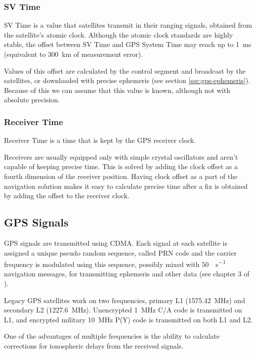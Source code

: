 \subsubsection{SV Time}
SV Time is a value that satellites transmit in their ranging signals,
obtained from the satellite's atomic clock.
Although the atomic clock standards are highly stable, the offset between SV
Time and GPS System Time may reach up to \SI{1}{\milli\second} (equivalent to
\SI{300}{\kilo\meter} of measurement error).

Values of this offset are calculated by the control segment
and broadcast by the satellites, or downloaded with precise ephemeris
(see section \ref{sec:gps-ephemeris}).
Because of this we can assume that this value is known, although not
with absolute precision.

\subsubsection{Receiver Time}
Receiver Time is a time that is kept by the GPS receiver clock.

Receivers are usually equipped only with simple crystal oscillators
and aren't capable of keeping precise time.
This is solved by adding the clock offset as a fourth dimension of the receiver position.
Having clock offset as a part of the navigation solution makes it easy to calculate
precise time after a fix is obtained by adding the offset to the receiver clock.

\subsection{GPS Signals}
GPS signals are transmitted using CDMA.
Each signal at each satellite is assigned a unique pseudo random sequence, called PRN code and the carrier frequency is
modulated using this sequence, possibly mixed with \SI{50}{\bit\per\second} navigation messages, for transmitting
ephemeris and other data (see chapter 3 of \cite{rizos99}).

Legacy GPS satellites work on two frequencies, primary L1 (\SI{1575.42}{\mega\hertz}) and secondary L2 (\SI{1227.6}{\mega\hertz}).
Unencrypted \SI{1}{\mega\hertz} C/A code is transmitted on L1, and encrypted military \SI{10}{\mega\hertz} P(Y) code is transmitted
on both L1 and L2.

One of the advantages of multiple frequencies is the ability to calculate corrections for ionospheric delays from the received signals.

